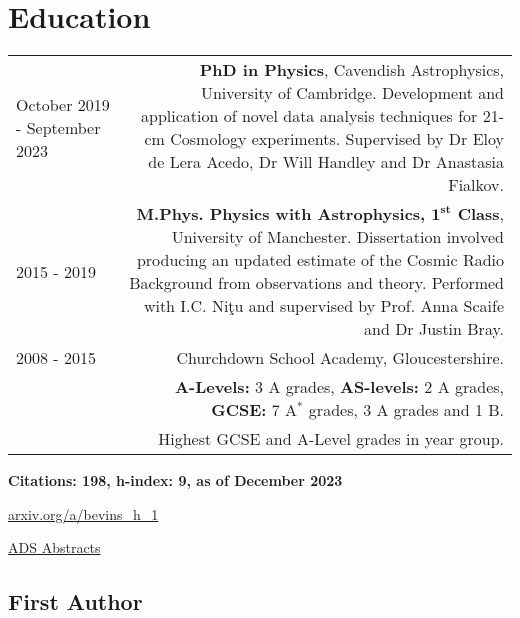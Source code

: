 \documentclass{article}
\begin{document}
\section*{Education}
\begin{tabular}{L!{\vrule}R}
	October 2019 - September 2023 & \textbf{PhD in Physics}, Cavendish Astrophysics, University of Cambridge. Development and application of novel data analysis techniques for 21-cm Cosmology experiments. Supervised by Dr Eloy de Lera Acedo, Dr Will Handley and Dr Anastasia Fialkov. \\
	2015 - 2019 & \textbf{M.Phys. Physics with Astrophysics, $\mathbf{1^{st}}$ Class}, University of Manchester. Dissertation involved producing an updated estimate of the Cosmic Radio Background from observations and theory. Performed with I.C. Ni\c{t}u and supervised by Prof. Anna Scaife and Dr Justin Bray. \\
	2008 - 2015 & Churchdown School Academy, Gloucestershire. \\ &\textbf{A-Levels:} 3 A grades, \textbf{AS-levels:} 2 A grades, \textbf{GCSE:} 7 A$^*$ grades, 3 A grades and 1 B. \\ & Highest GCSE and A-Level grades in year group.
\end{tabular}

 \hfill \textbf{Citations: 198, h-index: 9, as of December 2023}

\hfill \href{http://arxiv.org/a/bevins_h_1}{arxiv.org/a/bevins\_h\_1}

\hfill \href{https://ui.adsabs.harvard.edu/search/p_=0&q=author\%3A\%22Bevins\%2C\%20H.\%20T.\%20J.\%22&sort=date\%20desc\%2C\%20bibcode\%20desc}{ADS Abstracts}

\subsection*{First Author}
\end{document}
